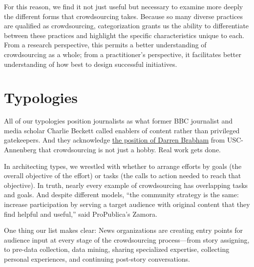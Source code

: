 \begin{itemize}
\begin{itemize}
For this reason, we find it not just useful but necessary to examine more deeply the different forms that crowdsourcing takes. Because so many diverse practices are qualified as crowdsourcing, categorization grants us the ability to differentiate between these practices and highlight the specific characteristics unique to each. From a research perspective, this permits a better understanding of crowdsourcing as a whole; from a practitioner’s perspective, it facilitates better understanding of how best to design successful initiatives.

\chapter{Typologies}  

All of our typologies position journalists as what former BBC journalist and media scholar Charlie Beckett called enablers of content rather than privileged gatekeepers.\autocite{Beckett} And they acknowledge \href{https://dbrabham.files.wordpress.com/2012/09/brabham-2012-ics-the-myth-of-amateur-crowds.pdf}{the position of Darren Brabham} from USC-Annenberg that crowdsourcing is not just a hobby. Real work gets done.\autocite{Brabham}

In architecting types, we wrestled with whether to arrange efforts by goals (the overall objective of the effort) or tasks (the calls to action needed to reach that objective). In truth, nearly every example of crowdsourcing has overlapping tasks and goals. And despite different models, ``the community strategy is the same: increase participation by serving a target audience with original content that they find helpful and useful,'' said ProPublica’s Zamora.

One thing our list makes clear: News organizations are creating entry points for audience input at every stage of the crowdsourcing process---from story assigning, to pre-data collection, data mining, sharing specialized expertise, collecting personal experiences, and continuing post-story conversations.


\end{itemize}
\end{itemize}
